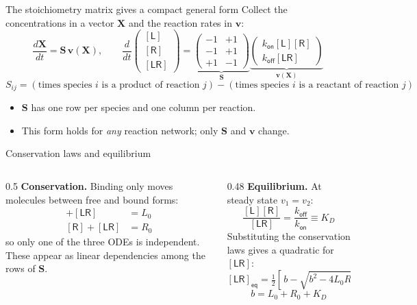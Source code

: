 \documentclass[aspectratio=169,10pt,t]{beamer}
\newcommand{\conc}[1]{[\mathsf{#1}]}
\begin{document}
\begin{frame}{The stoichiometry matrix gives a compact general form}
  Collect the concentrations in a vector $\mathbf{X}$ and the reaction rates in $\mathbf{v}$:
  \[
    \frac{d\mathbf{X}}{dt} = \mathbf{S}\,\mathbf{v}(\mathbf{X}),
    \qquad
    \frac{d}{dt}\begin{pmatrix}\conc{L}\\ \conc{R}\\ \conc{LR}\end{pmatrix}
    =
    \underbrace{\begin{pmatrix}-1 & +1\\ -1 & +1\\ +1 & -1\end{pmatrix}}_{\mathbf{S}}
    \underbrace{\begin{pmatrix}k_\mathsf{on}\conc{L}\conc{R}\\ k_\mathsf{off}\conc{LR}\end{pmatrix}}_{\mathbf{v}(\mathbf{X})}
  \]
  \vskip1mm
  \[
    S_{ij} = (\text{times species } i \text{ is a product of reaction } j)
           - (\text{times species } i \text{ is a reactant of reaction } j)
  \]
  \begin{itemize}
    \item<3-> $\mathbf{S}$ has one row per species and one column per reaction.
    \item<4-> This form holds for \emph{any} reaction network; only $\mathbf{S}$ and
          $\mathbf{v}$ change.
  \end{itemize}
\end{frame}

\begin{frame}{Conservation laws and equilibrium}
  \begin{columns}[T]
    \begin{column}{0.5\textwidth}
      \textbf{Conservation.} Binding only moves molecules between free and bound forms:
      \begin{align*}
        \conc{L} + \conc{LR} &= L_0\\
        \conc{R} + \conc{LR} &= R_0
      \end{align*}
      so only one of the three ODEs is independent.
      \vskip2mm
      {\small These appear as linear dependencies among the rows of $\mathbf{S}$.}
    \end{column}
    \begin{column}{0.48\textwidth}
      \textbf{Equilibrium.} At steady state $v_1 = v_2$:
      \[
        \frac{\conc{L}\conc{R}}{\conc{LR}} = \frac{k_\mathsf{off}}{k_\mathsf{on}} \equiv K_D
      \]
      Substituting the conservation laws gives a quadratic for $\conc{LR}$:
      \[
        \conc{LR}_\mathsf{eq} = \tfrac12\!\left[\,b - \sqrt{b^2 - 4L_0R_0}\,\right],
      \]
      \[
        b = L_0 + R_0 + K_D
      \]
    \end{column}
  \end{columns}
\end{frame}
\end{document}
